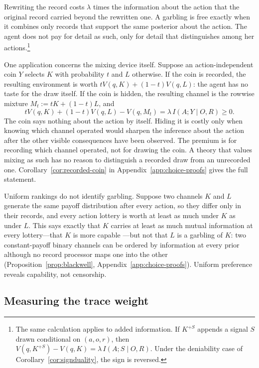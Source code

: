 \documentclass[11pt,a4paper]{article}
\theoremstyle{definition}
\newcommand{\I}{I}
\newcommand{\1}{\mathbf 1}
\begin{document}
Rewriting the record costs $\lambda$ times the information about the action that the original record carried
beyond the rewritten one.  A garbling is free exactly when it combines only records that support the same
posterior about the action.  The agent does not pay for detail as such, only for detail that distinguishes among
her actions.\footnote{The same calculation applies to added information.  If $K^{+S}$ appends a signal $S$
drawn conditional on $(a,o,r)$, then
$
 V(q,K^{+S})-V(q,K)=\lambda\,\I(A;S\mid O,R).
$
Under the deniability case of Corollary~\ref{cor:signduality}, the sign is reversed.}

One application concerns the mixing device itself.  Suppose an action-independent coin $Y$ selects $K$ with
probability $t$ and $L$ otherwise.  If the coin is recorded, the resulting environment is worth
$tV(q,K)+(1-t)V(q,L)$: the agent has no taste for the draw itself.  If the coin is hidden, the resulting channel
is the rowwise mixture $M_t:=tK+(1-t)L$, and
\[
 tV(q,K)+(1-t)V(q,L)-V(q,M_t)
 =\lambda\,\I(A;Y\mid O,R)\ge0.
\]
The coin says nothing about the action by itself.  Hiding it is costly only when knowing which channel operated
would sharpen the inference about the action after the other visible consequences have been observed.  The
premium is for recording which channel operated, not for drawing the coin.  A theory that values mixing as such
has no reason to distinguish a recorded draw from an unrecorded one.  Corollary~\ref{cor:recorded-coin} in
Appendix~\ref{app:choice-proofs} gives the full statement.

Uniform rankings do not identify garbling.  Suppose two channels $K$ and $L$ generate the same payoff distribution after every action, so they
differ only in their records, and every action lottery is worth at least as much under $K$ as under $L$.  This says
exactly that $K$ carries at least as much mutual information at every lottery---that $K$ is more capable
\cite{KornerMarton1977}---but not that $L$ is a garbling of $K$: two constant-payoff binary channels can be ordered
by information at every prior although no record processor maps one into the other
(Proposition~\ref{prop:blackwell}, Appendix~\ref{app:choice-proofs}).  Uniform preference reveals capability, not
censorship.

\subsection{Measuring the trace weight}\label{sec:measurement}
\end{document}
